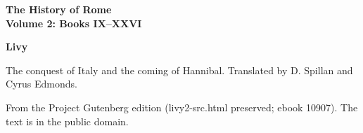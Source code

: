 \documentclass[11pt,letterpaper]{article}
\begin{document}
\color{ink}

\begin{titlepage}
\centering
\vspace*{4em}
{\LARGE\bfseries\color{heading} The History of Rome\\[0.3em]Volume 2: Books IX--XXVI\par}
\vspace{2em}
{\Large\bfseries\color{heading} Livy\par}
\vspace{2.5em}
{\itshape\color{subhead}\parbox{0.8\linewidth}{\centering The conquest of Italy and the coming of Hannibal. Translated by D. Spillan and Cyrus Edmonds.\par}}
\vfill
{\small From the Project Gutenberg edition (livy2-src.html preserved; ebook 10907). The text is in the public domain.\par}
\vspace{2em}
\end{titlepage}

\tableofcontents


\end{document}
